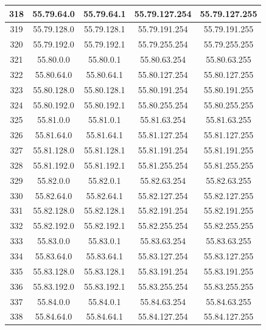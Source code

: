 \documentclass[letterpaper,12pt]{article}
\begin{document}
\begin{center}
\begin{longtable}{|c|c|c|c|c|}
                318 & 55.79.64.0 & 55.79.64.1 & 55.79.127.254 & 55.79.127.255 \\ \hline
                319 & 55.79.128.0 & 55.79.128.1 & 55.79.191.254 & 55.79.191.255 \\ \hline
                320 & 55.79.192.0 & 55.79.192.1 & 55.79.255.254 & 55.79.255.255 \\ \hline
                321 & 55.80.0.0 & 55.80.0.1 & 55.80.63.254 & 55.80.63.255 \\ \hline
                322 & 55.80.64.0 & 55.80.64.1 & 55.80.127.254 & 55.80.127.255 \\ \hline
                323 & 55.80.128.0 & 55.80.128.1 & 55.80.191.254 & 55.80.191.255 \\ \hline
                324 & 55.80.192.0 & 55.80.192.1 & 55.80.255.254 & 55.80.255.255 \\ \hline
                325 & 55.81.0.0 & 55.81.0.1 & 55.81.63.254 & 55.81.63.255 \\ \hline
                326 & 55.81.64.0 & 55.81.64.1 & 55.81.127.254 & 55.81.127.255 \\ \hline
                327 & 55.81.128.0 & 55.81.128.1 & 55.81.191.254 & 55.81.191.255 \\ \hline
                328 & 55.81.192.0 & 55.81.192.1 & 55.81.255.254 & 55.81.255.255 \\ \hline
                329 & 55.82.0.0 & 55.82.0.1 & 55.82.63.254 & 55.82.63.255 \\ \hline
                330 & 55.82.64.0 & 55.82.64.1 & 55.82.127.254 & 55.82.127.255 \\ \hline
                331 & 55.82.128.0 & 55.82.128.1 & 55.82.191.254 & 55.82.191.255 \\ \hline
                332 & 55.82.192.0 & 55.82.192.1 & 55.82.255.254 & 55.82.255.255 \\ \hline
                333 & 55.83.0.0 & 55.83.0.1 & 55.83.63.254 & 55.83.63.255 \\ \hline
                334 & 55.83.64.0 & 55.83.64.1 & 55.83.127.254 & 55.83.127.255 \\ \hline
                335 & 55.83.128.0 & 55.83.128.1 & 55.83.191.254 & 55.83.191.255 \\ \hline
                336 & 55.83.192.0 & 55.83.192.1 & 55.83.255.254 & 55.83.255.255 \\ \hline
                337 & 55.84.0.0 & 55.84.0.1 & 55.84.63.254 & 55.84.63.255 \\ \hline
                338 & 55.84.64.0 & 55.84.64.1 & 55.84.127.254 & 55.84.127.255 \\ \hline

\end{longtable}
\end{center}
\end{document}
